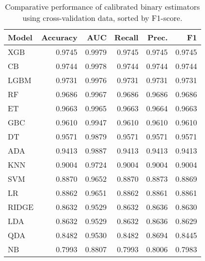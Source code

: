 \begin{table}
\caption{Comparative performance of calibrated binary estimators using cross-validation data, sorted by F1-score.}
\label{tbl:binary_cv_res_calibrated_models_df}
\begin{tabular}{lrrrrr}
\toprule
Model & Accuracy & AUC & Recall & Prec. & F1 \\
\midrule
XGB & 0.9745 & 0.9979 & 0.9745 & 0.9745 & 0.9745 \\
CB & 0.9744 & 0.9978 & 0.9744 & 0.9744 & 0.9744 \\
LGBM & 0.9731 & 0.9976 & 0.9731 & 0.9731 & 0.9731 \\
RF & 0.9686 & 0.9967 & 0.9686 & 0.9686 & 0.9686 \\
ET & 0.9663 & 0.9965 & 0.9663 & 0.9664 & 0.9663 \\
GBC & 0.9610 & 0.9947 & 0.9610 & 0.9610 & 0.9610 \\
DT & 0.9571 & 0.9879 & 0.9571 & 0.9571 & 0.9571 \\
ADA & 0.9413 & 0.9887 & 0.9413 & 0.9413 & 0.9413 \\
KNN & 0.9004 & 0.9724 & 0.9004 & 0.9004 & 0.9004 \\
SVM & 0.8870 & 0.9652 & 0.8870 & 0.8873 & 0.8869 \\
LR & 0.8862 & 0.9651 & 0.8862 & 0.8861 & 0.8861 \\
RIDGE & 0.8632 & 0.9529 & 0.8632 & 0.8636 & 0.8630 \\
LDA & 0.8632 & 0.9529 & 0.8632 & 0.8636 & 0.8629 \\
QDA & 0.8482 & 0.9530 & 0.8482 & 0.8694 & 0.8445 \\
NB & 0.7993 & 0.8807 & 0.7993 & 0.8006 & 0.7983 \\
\bottomrule
\end{tabular}
\end{table}
